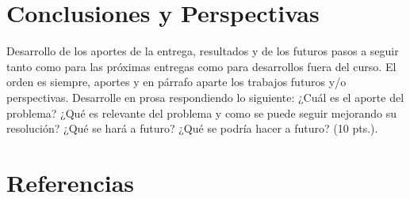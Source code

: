 \documentclass[journal, 10pt]{IEEEtran}
\begin{document}
 




\section{Conclusiones y Perspectivas}

Desarrollo de los aportes de la entrega, resultados y de los futuros pasos a seguir tanto como para las próximas entregas como para desarrollos fuera del curso. El orden es siempre, aportes y en párrafo aparte los trabajos futuros y/o perspectivas. Desarrolle en prosa respondiendo lo siguiente: ¿Cuál es el aporte del problema? ¿Qué es relevante del problema y como se puede seguir mejorando su resolución? ¿Qué se hará a futuro? ¿Qué se podría hacer a futuro? (10 pts.).

\newpage

\section{Referencias}


\end{document}
